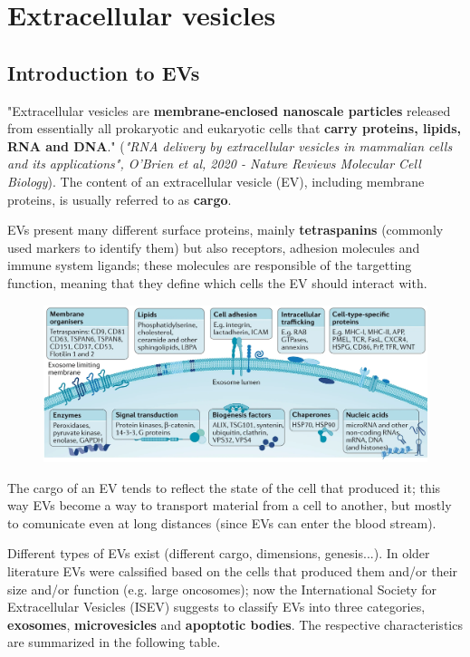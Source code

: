 \graphicspath{{chapters/TumorEvAndVesciclesImages/}}

\chapter{Extracellular vesicles}

\section{Introduction to EVs}

  "Extracellular vesicles are \textbf{membrane-enclosed nanoscale particles} released from essentially all prokaryotic and eukaryotic cells that \textbf{carry proteins, lipids, RNA and DNA}." (\textit{"RNA delivery by extracellular vesicles in mammalian cells and its applications", O’Brien et al, 2020 - Nature Reviews Molecular Cell Biology}). The content of an extracellular vesicle (EV), including membrane proteins, is usually referred to as \textbf{cargo}.

  EVs present many different surface proteins, mainly \textbf{tetraspanins} (commonly used markers to identify them) but also receptors, adhesion molecules and immune system ligands; these molecules are responsible of the targetting function, meaning that they define which cells the EV should interact with. 

  \begin{figure}[H]
  \includegraphics[scale=0.34]{image_07.png}
  \end{figure}
   
  The cargo of an EV tends to reflect the state of the cell that produced it; this way EVs become a way to transport material from a cell to another, but mostly to comunicate even at long distances (since EVs can enter the blood stream).

  Different types of EVs exist (different cargo, dimensions, genesis...). In older literature EVs were calssified based on the cells that produced them and/or their size and/or function (e.g. large oncosomes); now the International Society for Extracellular Vesicles (ISEV) suggests to classify EVs into three categories, \textbf{exosomes}, \textbf{microvesicles} and \textbf{apoptotic bodies}. The respective characteristics are summarized in the following table.
  

